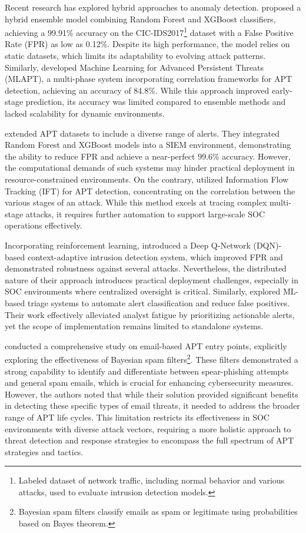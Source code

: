 Recent research has explored hybrid approaches to anomaly detection. 
\textcite{Saini2023} proposed a hybrid ensemble model combining Random Forest and XGBoost classifiers, achieving a 99.91\% accuracy on the CIC-IDS2017\footnote{Labeled dataset of network traffic, including normal behavior and various attacks, used to evaluate intrusion detection models.} dataset with a False Positive Rate (FPR) as low as 0.12\%. 
Despite its high performance, the model relies on static datasets, which limits its adaptability to evolving attack patterns. 
Similarly, \textcite{Ghafir2018} developed Machine Learning for Advanced Persistent Threats (MLAPT), a multi-phase system incorporating correlation frameworks for APT detection, achieving an accuracy of 84.8\%. 
While this approach improved early-stage prediction, its accuracy was limited compared to ensemble methods and lacked scalability for dynamic environments.

\textcite{Ali2024} extended APT datasets to include a diverse range of alerts. 
They integrated Random Forest and XGBoost models into a SIEM environment, demonstrating the ability to reduce FPR and achieve a near-perfect 99.6\% accuracy. 
However, the computational demands of such systems may hinder practical deployment in resource-constrained environments.
On the contrary, \textcite{Brogi2016} utilized Information Flow Tracking (IFT) for APT detection, concentrating on the correlation between the various stages of an attack. 
While this method excels at tracing complex multi-stage attacks, it requires further automation to support large-scale SOC operations effectively.

Incorporating reinforcement learning, \textcite{Sethi2020} introduced a Deep Q-Network (DQN)-based context-adaptive intrusion detection system, which improved FPR and demonstrated robustness against several attacks. 
Nevertheless, the distributed nature of their approach introduces practical deployment challenges, especially in SOC environments where centralized oversight is critical. 
Similarly, \textcite{Nila2020} explored ML-based triage systems to automate alert classification and reduce false positives. 
Their work effectively alleviated analyst fatigue by prioritizing actionable alerts, yet the scope of implementation remains limited to standalone systems.

\textcite{Chandra2016} conducted a comprehensive study on email-based APT entry points, explicitly exploring the effectiveness of Bayesian spam filters\footnote{Bayesian spam filters classify emails as spam or legitimate using probabilities based on Bayes theorem.}.
These filters demonstrated a strong capability to identify and differentiate between spear-phishing attempts and general spam emails, which is crucial for enhancing cybersecurity measures. 
However, the authors noted that while their solution provided significant benefits in detecting these specific types of email threats, it needed to address the broader range of APT life cycles.
This limitation restricts its effectiveness in SOC environments with diverse attack vectors, requiring a more holistic approach to threat detection and response strategies to encompass the full spectrum of APT strategies and tactics.

